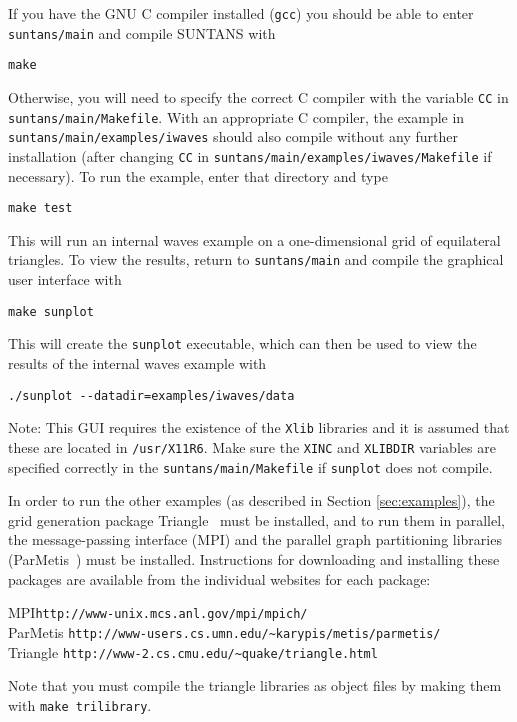 If you have the GNU C compiler installed (\verb+gcc+) you should be able to enter \verb+suntans/main+ and
compile SUNTANS with
\begin{verbatim}
make
\end{verbatim}
Otherwise, you will need to specify the correct C compiler with the variable \verb+CC+ in\\
\verb+suntans/main/Makefile+.  With an appropriate C compiler, the example in \\
\verb+suntans/main/examples/iwaves+ should also compile without any further
installation (after changing \verb+CC+ in \verb+suntans/main/examples/iwaves/Makefile+ if necessary).  
To run the example, enter that directory and type
\begin{verbatim}
make test
\end{verbatim}
This will run an internal waves example on a one-dimensional grid of equilateral
triangles.  To view the results, return to \verb+suntans/main+ and compile the graphical
user interface with
\begin{verbatim}
make sunplot
\end{verbatim}
This will create the \verb+sunplot+ executable, which can then be used to view the
results of the internal waves example with
\begin{verbatim}
./sunplot --datadir=examples/iwaves/data
\end{verbatim}
Note:  This GUI requires the
existence of the \verb+Xlib+ libraries and it is assumed that these are located
in \verb+/usr/X11R6+.  Make sure the \verb+XINC+ and \verb+XLIBDIR+ variables
are specified correctly in the \verb+suntans/main/Makefile+ if \verb+sunplot+ does not compile.

In order to run the other examples (as described in Section \ref{sec:examples}), the
grid generation package Triangle~\cite{TRIANGLE[1996]} must be installed, and to
run them in parallel, the message-passing
interface (MPI) and the parallel graph partitioning libraries (ParMetis~\cite{PARMETIS[1998]})
must be installed. Instructions for 
downloading and installing these packages are available from the individual websites
for each package:
\begin{tabbing}
MPI\hspace{0.5in}\=  \verb+http://www-unix.mcs.anl.gov/mpi/mpich/+\\
ParMetis \> \verb+http://www-users.cs.umn.edu/~karypis/metis/parmetis/+\\
Triangle \> \verb+http://www-2.cs.cmu.edu/~quake/triangle.html+
\end{tabbing}
Note that you must compile the triangle libraries as object files by making them
with \verb+make trilibrary+.  

